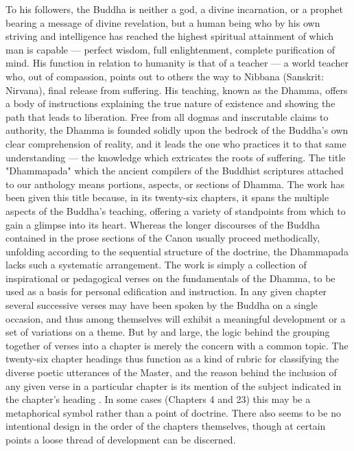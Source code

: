 	To his followers, the Buddha is neither a god, a divine incarnation, or a prophet bearing a message of divine revelation, but a human being who by his own striving and intelligence has reached the highest spiritual attainment of which man is capable — perfect wisdom, full enlightenment, complete purification of mind. His function in relation to humanity is that of a teacher — a world teacher who, out of compassion, points out to others the way to Nibbana (Sanskrit: Nirvana), final release from suffering. His teaching, known as the Dhamma, offers a body of instructions explaining the true nature of existence and showing the path that leads to liberation. Free from all dogmas and inscrutable claims to authority, the Dhamma is founded solidly upon the bedrock of the Buddha's own clear comprehension of reality, and it leads the one who practices it to that same understanding — the knowledge which extricates the roots of suffering.
	The title "Dhammapada" which the ancient compilers of the Buddhist scriptures attached to our anthology means portions, aspects, or sections of Dhamma. The work has been given this title because, in its twenty-six chapters, it spans the multiple aspects of the Buddha's teaching, offering a variety of standpoints from which to gain a glimpse into its heart. Whereas the longer discourses of the Buddha contained in the prose sections of the Canon usually proceed methodically, unfolding according to the sequential structure of the doctrine, the Dhammapada lacks such a systematic arrangement. The work is simply a collection of inspirational or pedagogical verses on the fundamentals of the Dhamma, to be used as a basis for personal edification and instruction. In any given chapter several successive verses may have been spoken by the Buddha on a single occasion, and thus among themselves will exhibit a meaningful development or a set of variations on a theme. But by and large, the logic behind the grouping together of verses into a chapter is merely the concern with a common topic. The twenty-six chapter headings thus function as a kind of rubric for classifying the diverse poetic utterances of the Master, and the reason behind the inclusion of any given verse in a particular chapter is its mention of the subject indicated in the chapter's heading . In some cases (Chapters 4 and 23) this may be a metaphorical symbol rather than a point of doctrine. There also seems to be no intentional design in the order of the chapters themselves, though at certain points a loose thread of development can be discerned.

